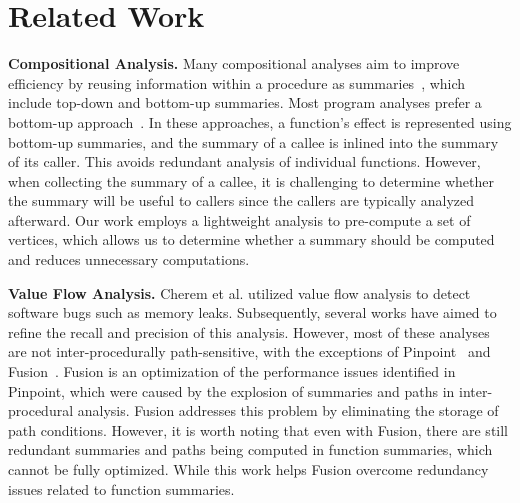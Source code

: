 \section{Related Work}
\textbf{Compositional Analysis.}
Many compositional analyses aim to improve efficiency by reusing information within a procedure as summaries~\cite{aikenSaturnManual, babic2008calysto, mcpeak2013scalable, shi2018pinpoint, shi2020pipelining, reps1995precise, sagiv1996precise}, which include top-down and bottom-up summaries.
Most program analyses prefer a bottom-up approach~\cite{aikenSaturnManual, babic2008calysto, mcpeak2013scalable, shi2018pinpoint, shi2020pipelining}. 
In these approaches, a function's effect is represented using bottom-up summaries, and the summary of a callee is inlined into the summary of its caller. 
This avoids redundant analysis of individual functions.
However, when collecting the summary of a callee, it is challenging to determine whether the summary will be useful to callers since the callers are typically analyzed afterward. 
Our work employs a lightweight analysis to pre-compute a set of vertices, which allows us to determine whether a summary should be computed and reduces unnecessary computations.


\textbf{Value Flow Analysis.}
Cherem et al.\cite{cherem2007practical} utilized value flow analysis to detect software bugs such as memory leaks. 
Subsequently, several works have aimed to refine the recall and precision of this analysis\cite{shi2018pinpoint, shi2020conquering, sui2016svf, sui2014detecting, shi2021path}. 
However, most of these analyses are not inter-procedurally path-sensitive, with the exceptions of Pinpoint~\cite{shi2018pinpoint} and Fusion~\cite{shi2021path}.
Fusion is an optimization of the performance issues identified in Pinpoint, which were caused by the explosion of summaries and paths in inter-procedural analysis. Fusion addresses this problem by eliminating the storage of path conditions. 
However, it is worth noting that even with Fusion, there are still redundant summaries and paths being computed in function summaries, which cannot be fully optimized.
While this work helps Fusion overcome redundancy issues related to function summaries.




